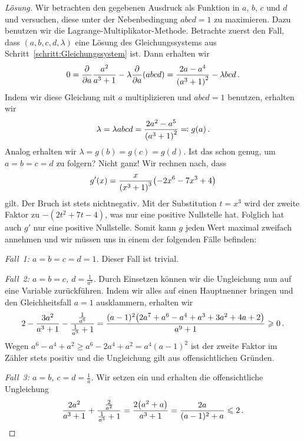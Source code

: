 \begin{proof}[Lösung]
	Wir betrachten den gegebenen Ausdruck als Funktion in $a$, $b$, $c$ und $d$ und versuchen, diese unter der Nebenbedingung $abcd=1$ zu maximieren. Dazu benutzen wir die Lagrange-Multiplikator-Methode. Betrachte zuerst den Fall, dass $(a,b,c,d,\lambda)$ eine Lösung des Gleichungssystems aus Schritt~\ref{schritt:Gleichungssystem} ist. Dann erhalten wir
	\begin{equation*}
		0=\frac{\partial}{\partial a}\frac{a^2}{a^3+1}-\lambda\frac{\partial}{\partial a}(abcd)=\frac{2a-a^4}{\parens*{a^3+1}^2}-\lambda bcd\,.
	\end{equation*}
	Indem wir diese Gleichung mit $a$ multiplizieren und $abcd=1$ benutzen, erhalten wir
	\begin{equation*}
		\lambda=\lambda abcd=\frac{2a^2-a^5}{\parens*{a^3+1}^2}\eqqcolon g(a)\,.
	\end{equation*}
	Analog erhalten wir $\lambda=g(b)=g(c)=g(d)$. Ist das schon genug, um $a=b=c=d$ zu folgern? Nicht ganz! Wir rechnen nach, dass
	\begin{equation*}
		g'(x)=\frac{x}{\parens*{x^3+1}^3}\parens*{-2x^6-7x^3+4}
	\end{equation*}
	gilt. Der Bruch ist stets nichtnegativ. Mit der Substitution $t=x^3$ wird der zweite Faktor zu $-(2t^2+7t-4)$, was nur eine positive Nullstelle hat. Folglich hat auch $g'$ nur eine positive Nullstelle. Somit kann $g$ jeden Wert maximal zweifach annehmen und wir müssen uns in einem der folgenden Fälle befinden:
	
	\emph{Fall~1: $a=b=c=d=1$.} Dieser Fall ist trivial.
	
	\emph{Fall~2: $a=b=c$, $d=\frac1{a^3}$.} Durch Einsetzen können wir die Ungleichung nun auf eine Variable zurückführen. Indem wir alles auf einen Hauptnenner bringen und den Gleichheitsfall $a=1$ ausklammern, erhalten wir
	\begin{equation*}
		2-\frac{3a^2}{a^3+1}-\frac{\frac{1}{a^6}}{\frac1{a^9}+1}=\frac{(a-1)^2\parens*{2a^7+a^6-a^4+a^3+3a^2+4a+2}}{a^9+1}\geqslant 0\,.
	\end{equation*}
	Wegen $a^6-a^4+a^2\geqslant a^6-2a^4+a^2=a^4(a-1)^2$ ist der zweite Faktor im Zähler stets positiv und die Ungleichung gilt aus offensichtlichen Gründen.
	
	\emph{Fall~3: $a=b$, $c=d=\frac1a$.} Wir setzen ein und erhalten die offensichtliche Ungleichung
	\begin{equation*}
		\frac{2a^2}{a^3+1}+\frac{\frac{2}{a^2}}{\frac1{a^3}+1}=\frac{2\parens*{a^2+a}}{a^3+1}=\frac{2a}{(a-1)^2+a}\leqslant 2\,.
	\end{equation*}
	

\end{proof}
